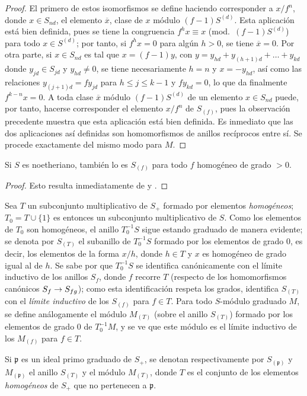 \documentclass[oneside,10pt]{amsart}
\makeatletter
\renewcommand{\leq}{\leqslant}
\newcommand{\ega@arrow}[2]{\mathchoice{#1}{#2}{#2}{#2}}
\renewcommand{\to}{\ega@arrow{\longrightarrow}{\rightarrow}}
\newcommand{\oldpage}[2][]{\marginnote{\normalfont\footnotesize\textbf{#1}~|~#2}\ignorespaces}
\let\EGAOriginalLabel\label
\renewcommand{\label}[1]{\phantomsection\EGAOriginalLabel{#1}}
\makeatother
\begin{document}
\begin{proof}
El primero de estos isomorfismos se define haciendo corresponder a $x/f^n$, donde $x\in S_{nd}$, el elemento $\overline{x}$, clase de $x$ módulo $(f-1)S^{(d)}$.
Esta aplicación está bien definida, pues se tiene la congruencia
$f^h x\equiv x$ (mod.~$(f-1)S^{(d)}$)
para todo $x\in S^{(d)}$; por tanto, si $f^h x=0$ para algún $h>0$,
\oldpage[II]{25}
se tiene $\overline{x}=0$.
Por otra parte, si $x\in S_{nd}$ es tal que $x=(f-1)y$, con
$y=y_{hd}+y_{(h+1)d}+\ldots+y_{kd}$
donde $y_{jd}\in S_{jd}$ y $y_{hd}\neq 0$, se tiene necesariamente $h=n$ y $x=-y_{hd}$, así como las relaciones $y_{(j+1)d}=fy_{jd}$ para $h\leq j\leq k-1$ y $fy_{kd}=0$, lo que da finalmente $f^{k-n}x=0$.
A toda clase $\overline{x}$ módulo $(f-1)S^{(d)}$ de un elemento $x\in S_{nd}$ puede, por tanto, hacerse corresponder el elemento $x/f^n$ de $S_{(f)}$, pues la observación precedente muestra que esta aplicación está bien definida.
Es inmediato que las dos aplicaciones así definidas son homomorfismos de anillos recíprocos entre sí.
Se procede exactamente del mismo modo para $M$.
\end{proof}

\begin{corollary}[2.2.6]
\label{II.2.2.6-fr}
Si $S$ es noetheriano, también lo es $S_{(f)}$ para todo $f$ homogéneo de grado $>0$.
\end{corollary}

\begin{proof}
Esto resulta inmediatamente de  y .
\end{proof}

\begin{env}[2.2.7]
\label{II.2.2.7-fr}
Sea $T$ un subconjunto multiplicativo de $S_+$ formado por elementos \emph{homogéneos}; $T_0=T\cup\{1\}$ es entonces un subconjunto multiplicativo de $S$.
Como los elementos de $T_0$ son homogéneos, el anillo $T_0^{-1}S$ sigue estando graduado de manera evidente; se denota por $S_{(T)}$ el subanillo de $T_0^{-1}S$ formado por los elementos de grado $0$, es decir, los elementos de la forma $x/h$, donde $h\in T$ y $x$ es homogéneo de grado igual al de $h$.
Se sabe por  que $T_0^{-1}S$ se identifica canónicamente con el límite inductivo de los anillos $S_f$, donde $f$ recorre $T$ (respecto de los homomorfismos canónicos $S_f\to S_{fg}$); como esta identificación respeta los grados, identifica $S_{(T)}$ con el \emph{límite inductivo} de los $S_{(f)}$ para $f\in T$.
Para todo $S$-módulo graduado $M$, se define análogamente el módulo $M_{(T)}$ (sobre el anillo $S_{(T)}$) formado por los elementos de grado $0$ de $T_0^{-1}M$, y se ve que este módulo es el límite inductivo de los $M_{(f)}$ para $f\in T$.

Si $\mathfrak{p}$ es un ideal primo graduado de $S_+$, se denotan respectivamente por $S_{(\mathfrak{p})}$ y $M_{(\mathfrak{p})}$ el anillo $S_{(T)}$ y el módulo $M_{(T)}$, donde $T$ es el conjunto de los elementos \emph{homogéneos} de $S_+$ que no pertenecen a $\mathfrak{p}$.
\end{env}
\end{document}
